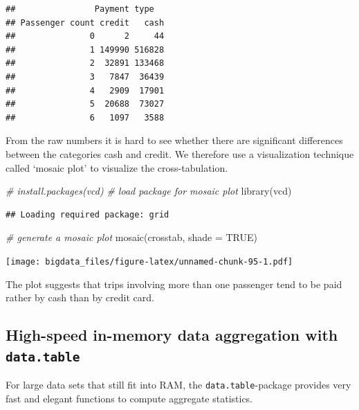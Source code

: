 \documentclass[
  12pt,
]{style/krantz}
\newenvironment{Shaded}{\begin{snugshade}}{\end{snugshade}}
\newcommand{\AttributeTok}[1]{\textcolor[rgb]{0.77,0.63,0.00}{#1}}
\newcommand{\CommentTok}[1]{\textcolor[rgb]{0.56,0.35,0.01}{\textit{#1}}}
\newcommand{\ConstantTok}[1]{\textcolor[rgb]{0.00,0.00,0.00}{#1}}
\newcommand{\FunctionTok}[1]{\textcolor[rgb]{0.00,0.00,0.00}{#1}}
\newcommand{\NormalTok}[1]{#1}
\begin{document}
\begin{verbatim}
##                Payment type
## Passenger count credit   cash
##               0      2     44
##               1 149990 516828
##               2  32891 133468
##               3   7847  36439
##               4   2909  17901
##               5  20688  73027
##               6   1097   3588
\end{verbatim}

From the raw numbers it is hard to see whether there are significant differences between the categories cash and credit. We therefore use a visualization technique called `mosaic plot' to visualize the cross-tabulation.

\begin{Shaded}
\begin{Highlighting}[]
\CommentTok{\# install.packages(vcd)}
\CommentTok{\# load package for mosaic plot}
\FunctionTok{library}\NormalTok{(vcd)}
\end{Highlighting}
\end{Shaded}

\begin{verbatim}
## Loading required package: grid
\end{verbatim}

\begin{Shaded}
\begin{Highlighting}[]
\CommentTok{\# generate a mosaic plot}
\FunctionTok{mosaic}\NormalTok{(crosstab, }\AttributeTok{shade =} \ConstantTok{TRUE}\NormalTok{)}
\end{Highlighting}
\end{Shaded}

\texttt{[image: bigdata\_files/figure-latex/unnamed-chunk-95-1.pdf]}

The plot suggests that trips involving more than one passenger tend to be paid rather by cash than by credit card.

\hypertarget{high-speed-in-memory-data-aggregation-with-data.table}{%
\subsection{\texorpdfstring{High-speed in-memory data aggregation with \texttt{data.table}}{High-speed in-memory data aggregation with data.table}}\label{high-speed-in-memory-data-aggregation-with-data.table}}

For large data sets that still fit into RAM, the \texttt{data.table}-package provides very fast and elegant functions to compute aggregate statistics.
\end{document}
